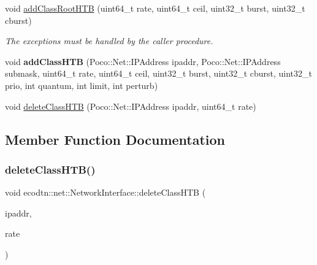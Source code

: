 \begin{DoxyCompactItemize}
\mbox{\label{classecodtn_1_1net_1_1NetworkInterface_a694a118abca1f19ad76ade749d3daf29}} 
void \hyperlink{classecodtn_1_1net_1_1NetworkInterface_a694a118abca1f19ad76ade749d3daf29}{add\+Class\+Root\+H\+TB} (uint64\+\_\+t rate, uint64\+\_\+t ceil, uint32\+\_\+t burst, uint32\+\_\+t cburst)
\begin{DoxyCompactList}\small\item\em The exceptions must be handled by the caller procedure. \end{DoxyCompactList}\item 
\mbox{\label{classecodtn_1_1net_1_1NetworkInterface_acd38e3cea5a6335c8af386d0e6c40140}} 
void {\bfseries add\+Class\+H\+TB} (Poco\+::\+Net\+::\+I\+P\+Address ipaddr, Poco\+::\+Net\+::\+I\+P\+Address submask, uint64\+\_\+t rate, uint64\+\_\+t ceil, uint32\+\_\+t burst, uint32\+\_\+t cburst, uint32\+\_\+t prio, int quantum, int limit, int perturb)
\item 
void \hyperlink{classecodtn_1_1net_1_1NetworkInterface_a9d71d2d606c03848732fe980544e733c}{delete\+Class\+H\+TB} (Poco\+::\+Net\+::\+I\+P\+Address ipaddr, uint64\+\_\+t rate)
\end{DoxyCompactItemize}


\subsection{Member Function Documentation}
\mbox{\label{classecodtn_1_1net_1_1NetworkInterface_a9d71d2d606c03848732fe980544e733c}} 
\subsubsection{\texorpdfstring{delete\+Class\+H\+T\+B()}{deleteClassHTB()}}
{\footnotesize\ttfamily void ecodtn\+::net\+::\+Network\+Interface\+::delete\+Class\+H\+TB (\begin{DoxyParamCaption}\item[{Poco\+::\+Net\+::\+I\+P\+Address}]{ipaddr,  }\item[{uint64\+\_\+t}]{rate }\end{DoxyParamCaption})}


